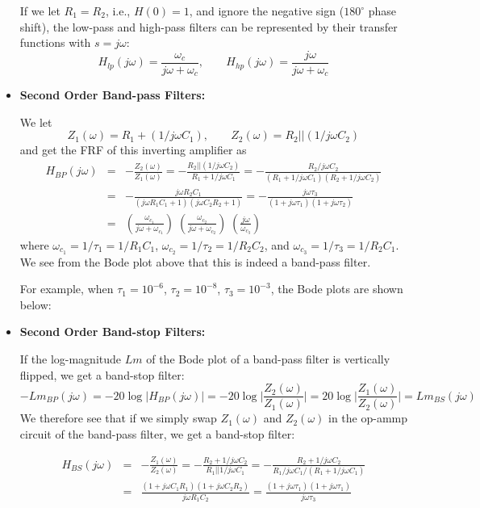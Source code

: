 \begin{itemize}

  If we let $R_1=R_2$, i.e., $H(0)=1$, and ignore the negative sign ($180^\circ$
  phase shift), the low-pass and high-pass filters can be represented by their
  transfer functions with $s=j\omega$:
  \[
  H_{lp}(j\omega)=\frac{\omega_c}{j\omega+\omega_c},
  \;\;\;\;\;\;\;H_{hp}(j\omega)=\frac{j\omega}{j\omega+\omega_c}
  \]

\item {\bf Second Order Band-pass Filters:}


  We let 
  \[
  Z_1(\omega)=R_1+(1/j\omega C_1),\;\;\;\;\;\;\;
  Z_2(\omega)=R_2||(1/j\omega C_2)
  \]
  and get the FRF of this inverting amplifier as
  \begin{eqnarray}
    H_{BP}(j\omega)&=&-\frac{Z_2(\omega)}{Z_1(\omega)}
    =-\frac{R_2||(1/j\omega C_2)}{R_1+1/j\omega C_1}
    =-\frac{R_2/j\omega C_2}{(R_1+1/j\omega C_1)(R_2+1/j\omega C_2)}
    \nonumber \\
    &=&-\frac{j\omega R_2C_1}{(j\omega R_1C_1+1)(j\omega C_2R_2+1)}
    =-\frac{j\omega \tau_3}{(1+j\omega \tau_1)(1+j\omega \tau_2)} 
    \nonumber \\
    &=&\left(\frac{\omega_{c_1}}{j\omega+\omega_{c_1}}\right)\;
    \left(\frac{\omega_{c_2}}{j\omega+\omega_{c_2}}\right)\;
    \left(\frac{j\omega}{\omega_{c_3}}\right)
    \nonumber
  \end{eqnarray}
  where $\omega_{c_1}=1/\tau_1=1/R_1C_1$, $\omega_{c_2}=1/\tau_2=1/R_2C_2$, 
  and $\omega_{c_3}=1/\tau_3=1/R_2C_1$. We see from the Bode plot above
  that this is indeed a band-pass filter.

  For example, when $\tau_1=10^{-6}$, $\tau_2=10^{-8}$, $\tau_3=10^{-3}$, 
  the Bode plots are shown below:


\item {\bf Second Order Band-stop Filters:}

  If the log-magnitude $Lm$ of the Bode plot of a band-pass filter is 
  vertically flipped, we get a band-stop filter:
  \[
  -Lm_{BP}(j\omega)=-20\log |H_{BP}(j\omega)|
  =-20\log \bigg| \frac{Z_2(\omega)}{Z_1(\omega)} \bigg|
  =20\log \bigg| \frac{Z_1(\omega)}{Z_2(\omega)} \bigg|
  =Lm_{BS}(j\omega)
  \]
  We therefore see that if we simply swap $Z_1(\omega)$ and $Z_2(\omega)$ 
  in the op-ammp circuit of the band-pass filter, we get a band-stop filter:

  \begin{eqnarray}
    H_{BS}(j\omega)&=&-\frac{Z_1(\omega)}{Z_2(\omega)}
    =-\frac{R_2+1/j\omega C_2}{R_1||1/j\omega C_1}
    =-\frac{R_2+1/j\omega C_2}{R_1/j\omega C_1/(R_1+1/j\omega C_1)}
    \nonumber \\
    &=& \frac{(1+j\omega C_1R_1)(1+j\omega C_2R_2)}{j\omega R_1C_2}
    =\frac{(1+j\omega\tau_1)(1+j\omega\tau_1)}{j\omega\tau_3}
    \nonumber
  \end{eqnarray}

\end{itemize}

